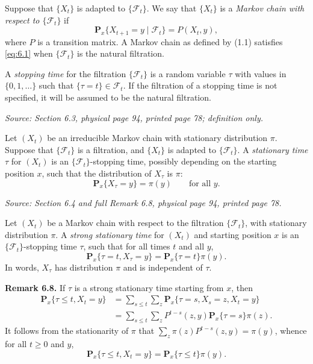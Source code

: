 \documentclass[11pt]{article}
\newcommand{\Ft}{\mathcal{F}_t}
\newcommand{\Px}{\mathbf{P}_x}
\newcommand{\sourceloc}[1]{\par\smallskip\noindent\textit{Source: #1.}\par\nopagebreak[4]\smallskip}
\begin{document}
Suppose that $\{X_t\}$ is adapted to $\{\Ft\}$. We say that $\{X_t\}$ is
a \emph{Markov chain with respect to $\{\Ft\}$} if
\begin{equation}
\Px\{X_{t+1}=y\mid\Ft\}=P(X_t,y),
\tag{6.1}\label{eq:6.1}
\end{equation}
where $P$ is a transition matrix. A Markov chain as defined by (1.1)
satisfies \eqref{eq:6.1} when $\{\Ft\}$ is the natural filtration.

A \emph{stopping time} for the filtration $\{\Ft\}$ is a random variable
$\tau$ with values in $\{0,1,\ldots\}$ such that $\{\tau=t\}\in\Ft$.
If the filtration of a stopping time is not specified, it will be assumed
to be the natural filtration.

\sourceloc{Section 6.3, physical page 94, printed page 78; definition only}
Let $(X_t)$ be an irreducible Markov chain with stationary distribution
$\pi$. Suppose that $\{\Ft\}$ is a filtration, and $\{X_t\}$ is adapted
to $\{\Ft\}$. A \emph{stationary time} $\tau$ for $(X_t)$ is an
$\{\Ft\}$-stopping time, possibly depending on the starting position $x$,
such that the distribution of $X_\tau$ is $\pi$:
\begin{equation}
\Px\{X_\tau=y\}=\pi(y)\qquad\text{for all }y.
\tag{6.2}\label{eq:6.2}
\end{equation}

\sourceloc{Section 6.4 and full Remark 6.8, physical page 94, printed page 78}
Let $(X_t)$ be a Markov chain with respect to the filtration $\{\Ft\}$,
with stationary distribution $\pi$. A \emph{strong stationary time} for
$(X_t)$ and starting position $x$ is an $\{\Ft\}$-stopping time $\tau$,
such that for all times $t$ and all $y$,
\begin{equation}
\Px\{\tau=t,X_\tau=y\}=\Px\{\tau=t\}\pi(y).
\tag{6.3}\label{eq:6.3}
\end{equation}
In words, $X_\tau$ has distribution $\pi$ and is independent of $\tau$.

\noindent\textbf{Remark 6.8.} If $\tau$ is a strong stationary time starting
from $x$, then
\begin{align*}
\Px\{\tau\le t,X_t=y\}
 &=\sum_{s\le t}\sum_z\Px\{\tau=s,X_s=z,X_t=y\}\\
 &=\sum_{s\le t}\sum_z P^{t-s}(z,y)\Px\{\tau=s\}\pi(z).
\end{align*}
It follows from the stationarity of $\pi$ that
$\sum_z\pi(z)P^{t-s}(z,y)=\pi(y)$, whence for all $t\ge0$ and $y$,
\begin{equation}
\Px\{\tau\le t,X_t=y\}=\Px\{\tau\le t\}\pi(y).
\tag{6.4}\label{eq:6.4}
\end{equation}
\end{document}
